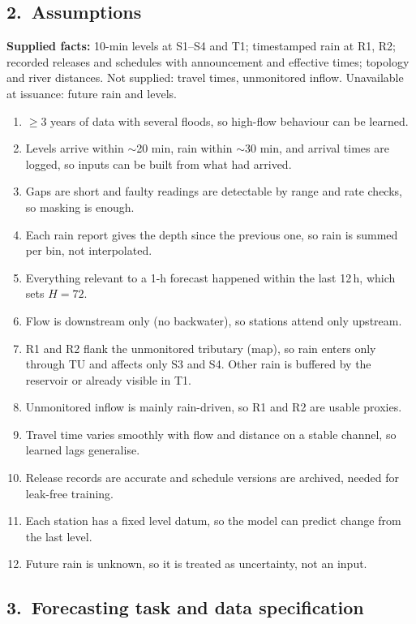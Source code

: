 \documentclass[11pt, a4paper]{article}
\begin{document}
\subsection*{2.\ Assumptions}

\textbf{Supplied facts:} 10-min levels at S1--S4 and T1; timestamped rain at R1, R2; recorded releases and schedules with announcement and effective times; topology and river distances. Not supplied: travel times, unmonitored inflow. Unavailable at issuance: future rain and levels.

\begin{enumerate}[label=\textbf{A\arabic*}, leftmargin=*, itemsep=0pt]
  \item $\ge$3 years of data with several floods, so high-flow behaviour can be learned.
  \item Levels arrive within $\sim$20 min, rain within $\sim$30 min, and arrival times are logged, so inputs can be built from what had arrived.
  \item Gaps are short and faulty readings are detectable by range and rate checks, so masking is enough.
  \item Each rain report gives the depth since the previous one, so rain is summed per bin, not interpolated.
  \item Everything relevant to a 1-h forecast happened within the last 12\,h, which sets $H{=}72$.
  \item Flow is downstream only (no backwater), so stations attend only upstream.
  \item R1 and R2 flank the unmonitored tributary (map), so rain enters only through TU and affects only S3 and S4. Other rain is buffered by the reservoir or already visible in T1.
  \item Unmonitored inflow is mainly rain-driven, so R1 and R2 are usable proxies.
  \item Travel time varies smoothly with flow and distance on a stable channel, so learned lags generalise.
  \item Release records are accurate and schedule versions are archived, needed for leak-free training.
  \item Each station has a fixed level datum, so the model can predict change from the last level.
  \item Future rain is unknown, so it is treated as uncertainty, not an input.
\end{enumerate}

\subsection*{3.\ Forecasting task and data specification}
\end{document}
